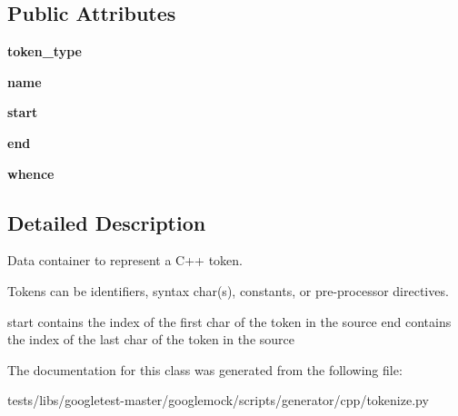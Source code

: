 \subsection*{Public Attributes}
\begin{DoxyCompactItemize}
\item 
\mbox{\label{classtests_1_1libs_1_1googletest-master_1_1googlemock_1_1scripts_1_1generator_1_1cpp_1_1tokenize_1_1Token_a63d87865d0bcfa1d52d2671ab8f2bc05}} 
{\bfseries token\+\_\+type}
\item 
\mbox{\label{classtests_1_1libs_1_1googletest-master_1_1googlemock_1_1scripts_1_1generator_1_1cpp_1_1tokenize_1_1Token_a0b3e541eb9744e889553f04adecaa2c6}} 
{\bfseries name}
\item 
\mbox{\label{classtests_1_1libs_1_1googletest-master_1_1googlemock_1_1scripts_1_1generator_1_1cpp_1_1tokenize_1_1Token_ac7c36e1c55cda52f9da8690bd63241e1}} 
{\bfseries start}
\item 
\mbox{\label{classtests_1_1libs_1_1googletest-master_1_1googlemock_1_1scripts_1_1generator_1_1cpp_1_1tokenize_1_1Token_a1fc6379cb4a278f1801ff463adcaca45}} 
{\bfseries end}
\item 
\mbox{\label{classtests_1_1libs_1_1googletest-master_1_1googlemock_1_1scripts_1_1generator_1_1cpp_1_1tokenize_1_1Token_a57368a9e62ab426b56303d6543d6889e}} 
{\bfseries whence}
\end{DoxyCompactItemize}


\subsection{Detailed Description}
\begin{DoxyVerb}Data container to represent a C++ token.

Tokens can be identifiers, syntax char(s), constants, or
pre-processor directives.

start contains the index of the first char of the token in the source
end contains the index of the last char of the token in the source
\end{DoxyVerb}
 

The documentation for this class was generated from the following file\+:\begin{DoxyCompactItemize}
\item 
tests/libs/googletest-\/master/googlemock/scripts/generator/cpp/tokenize.\+py\end{DoxyCompactItemize}
